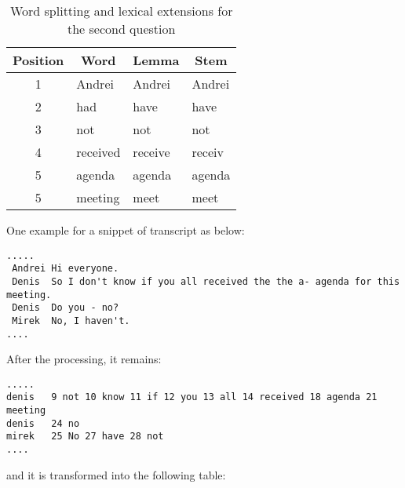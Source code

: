 \begin{table}[htbp]
\begin{center}
\scriptsize
\caption{Word splitting and lexical extensions for the second question}
\begin{tabular}{|c|l|l|l|}
\hline
\textbf{Position} & \multicolumn{1}{c|}{\textbf{Word}} & \multicolumn{1}{c|}{\textbf{Lemma}} & \multicolumn{1}{c|}{\textbf{Stem}} \\ \hline
1 & Andrei & Andrei & Andrei \\ \hline
2 & had & have & have \\ \hline
3 & not & not & not \\ \hline
4 & received & receive & receiv \\ \hline
5 & agenda & agenda & agenda \\ \hline
5 & meeting & meet & meet \\ \hline
\end{tabular}
\label{question2}
\end{center}
\end{table}

\normalsize



One example for a snippet of transcript as below:
\scriptsize
\begin{verbatim}
.....
 Andrei Hi everyone. 
 Denis  So I don't know if you all received the the a- agenda for this meeting.
 Denis 	Do you - no?
 Mirek 	No, I haven't.
....
\end{verbatim}
\normalsize

After the processing, it remains:
\scriptsize
\begin{verbatim}
.....
denis   9 not 10 know 11 if 12 you 13 all 14 received 18 agenda 21 meeting
denis   24 no 
mirek   25 No 27 have 28 not
....
\end{verbatim}
\normalsize

and it is transformed into the following table:

